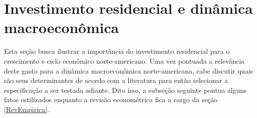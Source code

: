 \section{Investimento residencial e dinâmica macroeconômica}
\label{Secao_Residencial}

Esta seção busca ilustrar a importância do investimento residencial para o crescimento e ciclo econômico norte-americano. 
Uma vez pontuada a relevância deste gasto para a dinâmica macroeconômica norte-americana, cabe discutir quais são seus determinantes de acordo com a literatura para então selecionar a especificação a ser testada adiante.
Dito isso, a subseção seguinte pontua alguns fatos estilizados enquanto a revisão econométrica fica a cargo da seção \ref{RevEmpirica}.








